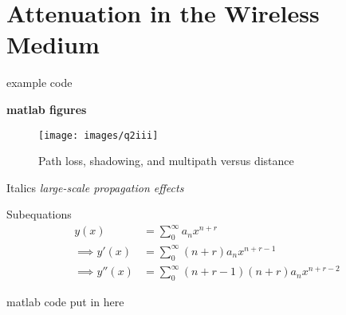 \section{Attenuation in the Wireless Medium}

example code

\textbf{matlab figures}
\begin{figure}[ht]
 \begin{center}
  \texttt{[image: images/q2iii]}
  \end{center}

 \vspace{-1cm}
 \caption{Path loss, shadowing, and multipath versus distance~\cite{Goldsmith_2005}}
 \label{fig:prop_effects}
\end{figure}


Italics
\textit{large-scale propagation effects} 


Subequations
\begin{align}
 y(x) &= \sum_0^{\infty}a_nx^{n+r}     \label{eqn:frobenius 6}\\
 \implies y'(x) &= \sum_0^{\infty}(n+r)a_nx^{n+r - 1}	\label{eqn: frobenius 7}  \\
 \implies y''(x) &= \sum_0^{\infty}(n+r-1)(n+r)a_nx^{n+r - 2}	\label{eqn: frobenius 8} 
\end{align}


matlab code put in here
\begin{verbatim*}
 
\end{verbatim*}
